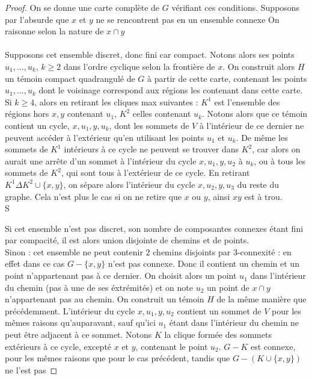 \documentclass{scrartcl}
\begin{document}
\begin{flushleft}
\begin{proof}
    On se donne une carte complète de $G$ vérifiant ces conditions. Supposons par l'absurde que $x$ et $y$ ne se rencontrent pas en un ensemble connexe
    On raisonne selon la nature de $x \cap y$
    \\~\\
    Supposons cet ensemble discret, donc fini car compact. Notons alors ses points
    $u_1, ..., u_k$, $k \geq 2$ dans l'ordre cyclique selon la frontière de $x$. On construit alors $H$ un témoin compact quadrangulé de $G$
    à partir de cette carte, contenant les points $u_1, ..., u_k$ dont le voisinage correspond aux régions les contenant dans cette carte.\\
    Si $k \geq 4$, alors en retirant les cliques max suivantes : $K^1$ est l'ensemble des régions hors $x, y$ contenant $u_1$,
    $K^2$ celles contenant $u_k$. Notons alors que ce témoin contient un cycle, $x, u_1, y, u_k$, dont les sommets de $V$ à l'intérieur
    de ce dernier ne peuvent accéder à l'extérieur qu'en utilisant les points $u_1$ et $u_k$. De même les sommets de $K^1$ intérieurs
    à ce cycle ne peuvent se trouver dans $K^2$, car alors on aurait une arrête d'un sommet à l'intérieur du cycle $x, u_1, y, u_2$
    à $u_k$, ou à tous les sommets de $K^2$, qui sont tous à l'extérieur de ce cycle. En retirant $K^1 \Delta K^2 \cup \{x,y\}$, on sépare
    alors l'intérieur du cycle $x, u_2, y, u_3$ du reste du graphe. Cela n'est plus le cas si on ne retire que $x$ ou $y$, ainsi $xy$
    est à trou.\\
    S

    Si cet ensemble n'est pas discret, son nombre de composantes connexes étant fini par compacité, il est alors union disjointe de chemins
    et de points.\\
    Sinon : cet ensemble ne peut contenir $2$ chemins disjoints par $3$-connexité : en effet dans ce cas $G - \{x, y\}$ n'est pas connexe.
    Donc il contient un chemin et un point n'appartenant pas à ce dernier. On choisit alors un point $u_1$ dans l'intérieur du chemin (pas à une
    de ses éxtrémités) et on note $u_2$ un point de $x \cap y$ n'appartenant pas au chemin. On construit un témoin $H$ de la même manière que précédemment.
    L'intérieur du cycle $x, u_1, y, u_2$ contient un sommet de $V$ pour les mêmes raisons qu'auparavant, sauf qu'ici $u_1$ étant dans l'intérieur
    du chemin ne peut être adjacent à ce sommet. Notons $K$ la clique formée des sommets extérieurs à ce cycle, excepté $x$ et $y$, contenant le point $u_2$.
    $G - K$ est connexe, pour les mêmes raisons que pour le cas précédent, tandis que $G - (K \cup \{x, y\})$ ne l'est pas
\end{proof}


\end{flushleft}
\end{document}
